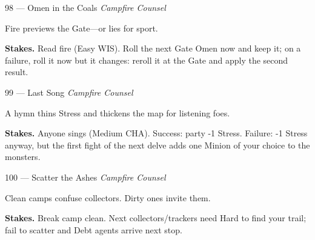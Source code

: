 \begin{encounterentry}{98 --- Omen in the Coals}
\textit{Campfire Counsel}

Fire previews the Gate---or lies for sport.

\textbf{Stakes.} Read fire (Easy WIS). Roll the next Gate Omen now and keep it; on a failure, roll it now but it changes: reroll it at the Gate and apply the second result.
\end{encounterentry}

\begin{encounterentry}{99 --- Last Song}
\textit{Campfire Counsel}

A hymn thins Stress and thickens the map for listening foes.

\textbf{Stakes.} Anyone sings (Medium CHA). Success: party -1 Stress. Failure: -1 Stress anyway, but the first fight of the next delve adds one Minion of your choice to the monsters.
\end{encounterentry}

\begin{encounterentry}{100 --- Scatter the Ashes}
\textit{Campfire Counsel}

Clean camps confuse collectors. Dirty ones invite them.

\textbf{Stakes.} Break camp clean. Next collectors/trackers need Hard to find your trail; fail to scatter and Debt agents arrive next stop.
\end{encounterentry}

